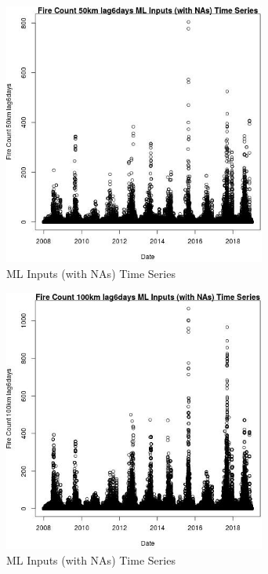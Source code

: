 \begin{figure} 
\centering  
\includegraphics[width=0.77\textwidth]{Code_Outputs/Report_ML_input_PM25_Step4_part_f_de_duplicated_aveswNAs_Fire_Count_50km_lag6daysvDate.jpg} 
\caption{\label{fig:Report_ML_input_PM25_Step4_part_f_de_duplicated_aveswNAsFire_Count_50km_lag6daysvDate}ML Inputs (with NAs) Time Series} 
\end{figure} 
 

\begin{figure} 
\centering  
\includegraphics[width=0.77\textwidth]{Code_Outputs/Report_ML_input_PM25_Step4_part_f_de_duplicated_aveswNAs_Fire_Count_100km_lag6daysvDate.jpg} 
\caption{\label{fig:Report_ML_input_PM25_Step4_part_f_de_duplicated_aveswNAsFire_Count_100km_lag6daysvDate}ML Inputs (with NAs) Time Series} 
\end{figure} 
 

